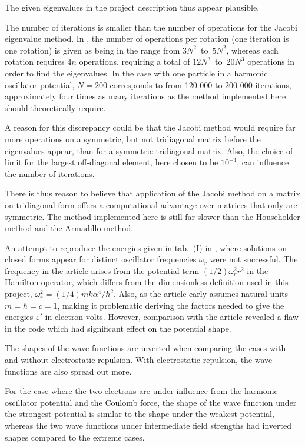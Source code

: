 \documentclass[a4paper,11pt]{article}
\begin{document}
The given eigenvalues in the project description thus appear plausible.

The number of iterations is smaller than the number of operations for the Jacobi eigenvalue method. In \cite{MHJensen:2012}, the number of operations per rotation (one iteration is one rotation) is given as being in the range from $3N^2$~to~$5N^2$, whereas each rotation requires $4n$ operations, requiring a total of $12N^3$~to~$20N^3$ operations in order to find the eigenvalues. In the case with one particle in a harmonic oscillator potential, $N=200$ corresponds to from 120 000 to 200 000 iterations, approximately four times as many iterations as the method implemented here should theoretically require.

A reason for this discrepancy could be that the Jacobi method would require far more operations on a symmetric, but not tridiagonal matrix before the eigenvalues appear, than for a symmetric tridiagonal matrix. Also, the choice of limit for the largest off-diagonal element, here chosen to be $10^{-4}$, can influence the number of iterations.

There is thus reason to believe that application of the Jacobi method on a matrix on tridiagonal form offers a computational advantage over matrices that only are symmetric. The method implemented here is still far slower than the Householder method and the Armadillo method.

An attempt to reproduce the energies given in tab.~(I) in \cite{Taut:1993}, where solutions on closed forms appear for distinct oscillator frequencies $\omega_r$ were not successful. The frequency in the article arises from the potential term $(1/2)\omega_r^2 r^2$ in the Hamilton operator, which differs from the dimensionless definition used in this project, $\omega_r^2 = (1/4) mk\alpha^4 / \hbar^2$. Also, as the article early assumes natural units $m = \hbar = c = 1$, making it problematic deriving the factors needed to give the energies $\varepsilon'$ in electron volts. However, comparison with the article revealed a flaw in the code which had significant effect on the potential shape.

The shapes of the wave functions are inverted when comparing the cases with and without electrostatic repulsion. With electrostatic repulsion, the wave functions are also spread out more.

For the case where the two electrons are under influence from the harmonic oscillator potential and the Coulomb force, the shape of the wave function under the strongest potential is similar to the shape under the weakest potential, whereas the two wave functions under intermediate field strengths had inverted shapes compared to the extreme cases.
\end{document}
